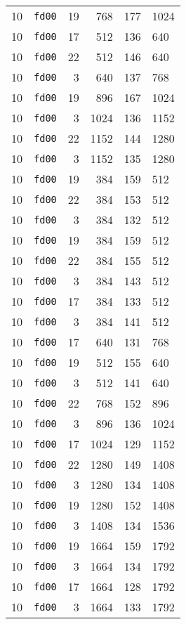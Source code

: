 \documentclass{article}
\begin{document}
\begin{table}[h!]
\begin{tabular}{llrrrl}
    10 & \texttt{fd00} & 19 & 768 & 177 & 1024 \\
    10 & \texttt{fd00} & 17 & 512 & 136 & 640 \\
    10 & \texttt{fd00} & 22 & 512 & 146 & 640 \\
    10 & \texttt{fd00} & 3 & 640 & 137 & 768 \\
    10 & \texttt{fd00} & 19 & 896 & 167 & 1024 \\
    10 & \texttt{fd00} & 3 & 1024 & 136 & 1152 \\
    10 & \texttt{fd00} & 22 & 1152 & 144 & 1280 \\
    10 & \texttt{fd00} & 3 & 1152 & 135 & 1280 \\
    10 & \texttt{fd00} & 19 & 384 & 159 & 512 \\
    10 & \texttt{fd00} & 22 & 384 & 153 & 512 \\
    10 & \texttt{fd00} & 3 & 384 & 132 & 512 \\
    10 & \texttt{fd00} & 19 & 384 & 159 & 512 \\
    10 & \texttt{fd00} & 22 & 384 & 155 & 512 \\
    10 & \texttt{fd00} & 3 & 384 & 143 & 512 \\
    10 & \texttt{fd00} & 17 & 384 & 133 & 512 \\
    10 & \texttt{fd00} & 3 & 384 & 141 & 512 \\
    10 & \texttt{fd00} & 17 & 640 & 131 & 768 \\
    10 & \texttt{fd00} & 19 & 512 & 155 & 640 \\
    10 & \texttt{fd00} & 3 & 512 & 141 & 640 \\
    10 & \texttt{fd00} & 22 & 768 & 152 & 896 \\
    10 & \texttt{fd00} & 3 & 896 & 136 & 1024 \\
    10 & \texttt{fd00} & 17 & 1024 & 129 & 1152 \\
    10 & \texttt{fd00} & 22 & 1280 & 149 & 1408 \\
    10 & \texttt{fd00} & 3 & 1280 & 134 & 1408 \\
    10 & \texttt{fd00} & 19 & 1280 & 152 & 1408 \\
    10 & \texttt{fd00} & 3 & 1408 & 134 & 1536 \\
    10 & \texttt{fd00} & 19 & 1664 & 159 & 1792 \\
    10 & \texttt{fd00} & 3 & 1664 & 134 & 1792 \\
    10 & \texttt{fd00} & 17 & 1664 & 128 & 1792 \\
    10 & \texttt{fd00} & 3 & 1664 & 133 & 1792 \\

\end{tabular}
\end{table}
\end{document}
